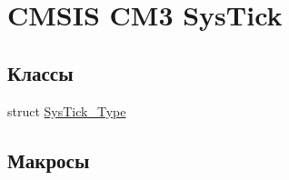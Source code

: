 \hypertarget{group___c_m_s_i_s___c_m3___sys_tick}{}\section{C\+M\+S\+IS C\+M3 Sys\+Tick}
\label{group___c_m_s_i_s___c_m3___sys_tick}
\subsection*{Классы}
\begin{DoxyCompactItemize}
\item 
struct \mbox{\hyperlink{struct_sys_tick___type}{Sys\+Tick\+\_\+\+Type}}
\end{DoxyCompactItemize}
\subsection*{Макросы}
